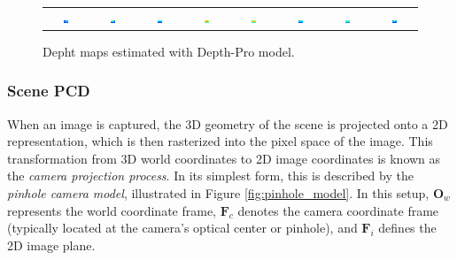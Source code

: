 \begin{figure}[h]
\begin{tabular}{c c c c c c c c}
        \includegraphics[width=0.12\textwidth]{images/metodology/depth_images/colored_depth_map_0.png} & 
        \includegraphics[width=0.12\textwidth]{images/metodology/depth_images/colored_depth_map_1.png} & 
        \includegraphics[width=0.12\textwidth]{images/metodology/depth_images/colored_depth_map_2.png} &
        \includegraphics[width=0.12\textwidth]{images/metodology/depth_images/colored_depth_map_3.png} &
        \includegraphics[width=0.12\textwidth]{images/metodology/depth_images/colored_depth_map_4.png} &   
        \includegraphics[width=0.12\textwidth]{images/metodology/depth_images/colored_depth_map_5.png} & 
        \includegraphics[width=0.12\textwidth]{images/metodology/depth_images/colored_depth_map_6.png} &
        \includegraphics[width=0.12\textwidth]{images/metodology/depth_images/colored_depth_map_7.png} \\
    \end{tabular}    
    \caption{Depht maps estimated with Depth-Pro model.}
    \label{fig:depth_images}
\end{figure}

\subsubsection{Scene PCD}
When an image is captured, the 3D geometry of the scene is projected onto a 2D representation, which is then rasterized into the pixel space of the image. This transformation from 3D world coordinates to 2D image coordinates is known as the \emph{camera projection process}. In its simplest form, this is described by the \emph{pinhole camera model}, illustrated in Figure \ref{fig:pinhole_model}. In this setup, $\mathbf{O}_w$ represents the world coordinate frame, $\mathbf{F}_c$ denotes the camera coordinate frame (typically located at the camera's optical center or pinhole), and $\mathbf{F}_i$ defines the 2D image plane.

